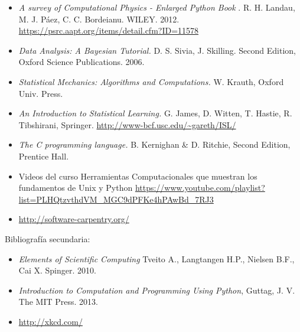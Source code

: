 \documentclass[letterpaper,10pt,onecolumn]{article}
\begin{document}
\begin{itemize}
\item
\textit{A survey of Computational Physics - Enlarged Python Book}
. R. H. Landau, M. J. P\'aez, C. C. Bordeianu. WILEY. 2012.
\url{https://psrc.aapt.org/items/detail.cfm?ID=11578}

\item
\textit{Data Analysis: A Bayesian Tutorial.} D. S. Sivia,
J. Skilling. Second Edition, Oxford Science Publications. 2006.

\item 
\textit{Statistical Mechanics: Algorithms and Computations.}
W. Krauth, Oxford Univ. Press. 

\item
\textit{An Introduction to Statistical Learning.} G. James, D. Witten,
T. Hastie, R. Tibshirani,
Springer. \url{http://www-bcf.usc.edu/~gareth/ISL/} 

\item
\textit{The C programming language.}
 B. Kernighan \& D. Ritchie, Second Edition, Prentice Hall.

\item Videos del curso Herramientas Computacionales que muestran los
  fundamentos de Unix y Python \url{https://www.youtube.com/playlist?list=PLHQtzvthdVM_MGC9dPFKe4hPAwBd_7RJ3}

\item\url{http://software-carpentry.org/}
\end{itemize}

\noindent\normalsize Bibliograf\'ia secundaria:
\begin{itemize}
\item
\textit{Elements of Scientific Computing}
Tveito A., Langtangen H.P., Nielsen B.F., Cai X. Spinger. 2010.


\item 
\textit{Introduction to Computation and Programming Using Python},
Guttag, J. V. The MIT Press. 2013.

\item\url{http://xkcd.com/}
\end{itemize}
\end{document}

